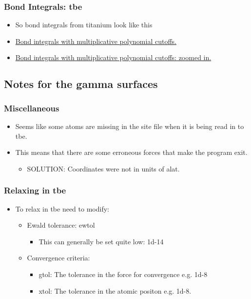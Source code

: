 \documentclass[11pt]{article}
\begin{document}
\subsubsection{Bond Integrals: tbe}
\label{sec-2-1-2}
\begin{itemize}
\item So bond integrals from titanium look like this
\item \href{file:///home/tigany/Documents/ti/complete_titanium/ti_01-11-18/plot_bond_integrals/tbe_bond_integrals_with_polynomial_cutoffs_multiplicative_alt.png}{Bond integrals with multiplicative polynomial cutoffs. }
\item \href{file:///home/tigany/Documents/ti/complete_titanium/ti_01-11-18/plot_bond_integrals/tbe_bond_integrals_with_polynomial_cutoffs_multiplicative_zoomed_in.png}{Bond integrals with multiplicative polynomial cutoffs: zoomed in.}
\end{itemize}


\subsection{Notes for the gamma surfaces}
\label{sec-2-2}
\subsubsection{Miscellaneous}
\label{sec-2-2-1}
\begin{itemize}
\item Seems like some atoms are missing in the site file when it is being read
in to tbe.
\item This means that there are some erroneous forces that make the program
exit.
\begin{itemize}
\item SOLUTION: Coordinates were not in units of alat.
\end{itemize}
\end{itemize}
\subsubsection{Relaxing in tbe}
\label{sec-2-2-2}
\begin{itemize}
\item To relax in tbe need to modify:
\begin{itemize}
\item Ewald tolerance: ewtol
\begin{itemize}
\item This can generally be set quite low: 1d-14
\end{itemize}
\item Convergence criteria:
\begin{itemize}
\item gtol: The tolerance in the force for convergence e.g. 1d-8
\item xtol: The tolerance in the atomic positon e.g. 1d-8.
\end{itemize}
\end{itemize}
\end{itemize}
\end{document}
